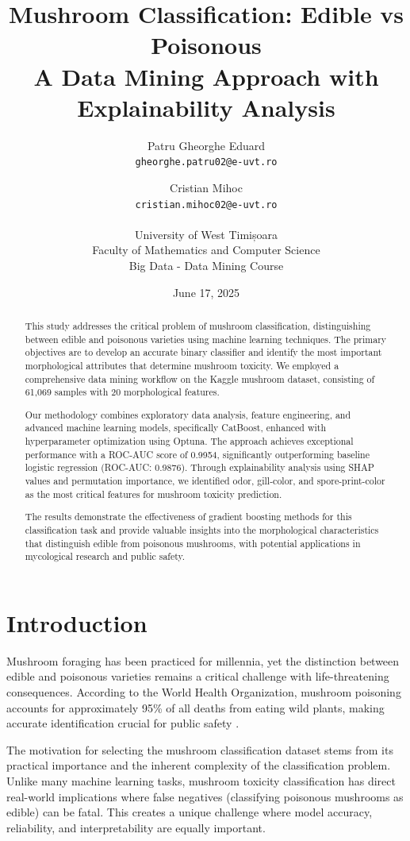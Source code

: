 \documentclass[11pt,a4paper]{article}
\title{\textbf{Mushroom Classification: Edible vs Poisonous} \\ 
       \large{A Data Mining Approach with Explainability Analysis}}
\author{
    Patru Gheorghe Eduard \\
    \texttt{gheorghe.patru02@e-uvt.ro} \\
    \and
    Cristian Mihoc \\
    \texttt{cristian.mihoc02@e-uvt.ro} \\
    \\
    \small{University of West Timișoara} \\
    \small{Faculty of Mathematics and Computer Science} \\
    \small{Big Data - Data Mining Course}}
\date{June 17, 2025}
\begin{document}
\maketitle

\tableofcontents
\newpage

\begin{abstract}
This study addresses the critical problem of mushroom classification, distinguishing between edible and poisonous varieties using machine learning techniques. The primary objectives are to develop an accurate binary classifier and identify the most important morphological attributes that determine mushroom toxicity. We employed a comprehensive data mining workflow on the Kaggle mushroom dataset, consisting of 61,069 samples with 20 morphological features.

Our methodology combines exploratory data analysis, feature engineering, and advanced machine learning models, specifically CatBoost, enhanced with hyperparameter optimization using Optuna. The approach achieves exceptional performance with a ROC-AUC score of 0.9954, significantly outperforming baseline logistic regression (ROC-AUC: 0.9876). Through explainability analysis using SHAP values and permutation importance, we identified odor, gill-color, and spore-print-color as the most critical features for mushroom toxicity prediction.

The results demonstrate the effectiveness of gradient boosting methods for this classification task and provide valuable insights into the morphological characteristics that distinguish edible from poisonous mushrooms, with potential applications in mycological research and public safety.
\end{abstract}

\section{Introduction}

Mushroom foraging has been practiced for millennia, yet the distinction between edible and poisonous varieties remains a critical challenge with life-threatening consequences. According to the World Health Organization, mushroom poisoning accounts for approximately 95\% of all deaths from eating wild plants, making accurate identification crucial for public safety \cite{who2016mushroom}.

The motivation for selecting the mushroom classification dataset stems from its practical importance and the inherent complexity of the classification problem. Unlike many machine learning tasks, mushroom toxicity classification has direct real-world implications where false negatives (classifying poisonous mushrooms as edible) can be fatal. This creates a unique challenge where model accuracy, reliability, and interpretability are equally important.
\end{document}
